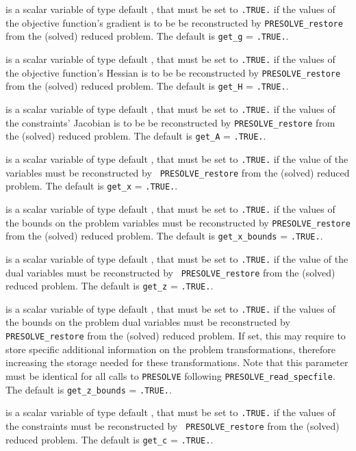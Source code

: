 \documentclass{galahad}
\newcommand{\packagename}{PRESOLVE}
\begin{document}
\begin{description}
 is a scalar variable of type default \logical, that
must be set to {\tt .TRUE.} if the values of the objective
function's gradient is to be be reconstructed
by {\tt \packagename\_restore} from the (solved) reduced problem.
The default is {\tt get\_g} = {\tt .TRUE.}.

 is a scalar variable of type default \logical, that
must be set to {\tt .TRUE.} if the values of the objective
function's Hessian is to be be reconstructed
by {\tt \packagename\_restore} from the (solved) reduced problem.
The default is {\tt get\_H} = {\tt .TRUE.}.

 is a scalar variable of type default \logical, that
must be set to {\tt .TRUE.} if the values of the constraints'
Jacobian is to be be reconstructed
by {\tt \packagename\_restore} from the (solved) reduced problem.
The default is {\tt get\_A} = {\tt .TRUE.}.

 is a scalar variable of type default \logical, that
must be set to {\tt .TRUE.} if the value of the variables
must be reconstructed by {\tt
\packagename\_restore} from the (solved) reduced problem.
The default is {\tt get\_x} = {\tt .TRUE.}.

 is a scalar variable of type default \logical, that
must be set to {\tt .TRUE.} if the values of the bounds on the
problem variables must be reconstructed by {\tt \packagename\_restore}
from the (solved) reduced problem.
The default is {\tt get\_x\_bounds} = {\tt .TRUE.}.

 is a scalar variable of type default \logical, that
must be set to {\tt .TRUE.} if the value of the dual variables
must be reconstructed by {\tt
\packagename\_restore} from the (solved) reduced problem.
The default is {\tt get\_z} = {\tt .TRUE.}.

 is a scalar variable of type default \logical, that
must be set to {\tt .TRUE.} if the values of the bounds on the
problem dual variables must be reconstructed by {\tt \packagename\_restore}
from the (solved) reduced problem.
If set, this may require to store specific
additional information on the problem transformations,
therefore increasing the storage needed for these transformations.
Note that this parameter must be identical for all calls to
{\tt \packagename} following {\tt \packagename\_read\_specfile}.
The default is {\tt get\_z\_bounds} = {\tt .TRUE.}.

 is a scalar variable of type default \logical, that
must be set to {\tt .TRUE.} if the values of the constraints
must be reconstructed by {\tt
\packagename\_restore} from the (solved) reduced problem.
The default is {\tt get\_c} = {\tt .TRUE.}.


\end{description}
\end{document}
